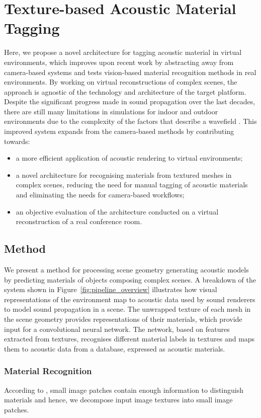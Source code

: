 \section{Texture-based Acoustic Material Tagging}\label{sec:texture-tagging}
Here, we propose a novel architecture for tagging acoustic material in virtual environments, which improves upon recent work by abstracting away from camera-based systems and tests vision-based material recognition methods in real environments. By working on virtual reconstructions of complex scenes, the approach is agnostic of the technology and architecture of the target platform. Despite the significant progress made in sound propagation over the last decades, there are still many limitations in simulations for indoor and outdoor environments due to the complexity of the factors that describe a wavefield \cite{liu2020sound}. This improved system expands from the camera-based methods by contributing towards:
\begin{itemize}
    \item a more efficient application of acoustic rendering to virtual environments;
    \item a novel architecture for recognising materials from textured meshes in complex scenes, reducing the need for manual tagging of acoustic materials and eliminating the needs for camera-based workflows; 
    \item an objective evaluation of the architecture conducted on a virtual reconstruction of a real conference room.
\end{itemize}

\subsection{Method}
We present a method for processing scene geometry generating acoustic models by predicting materials of objects composing complex scenes. A breakdown of the system shown in Figure~\ref{fig:pipeline_overview} illustrates how visual representations of the environment map to acoustic data used by sound renderers to model sound propagation in a scene. The unwrapped texture of each mesh in the scene geometry provides representations of their materials, which provide input for a convolutional neural network. The network, based on features extracted from textures, recognises different material labels in textures and maps them to acoustic data from a database, expressed as acoustic materials.

\subsubsection{Material Recognition}
According to \cite{schwartz2019recognizing}, small image patches contain enough information to distinguish materials and hence, we decompose input image textures into small image patches.
